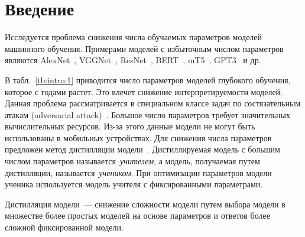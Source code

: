 \documentclass[12pt]{a&t}
\begin{document}
\section{Введение}
Исследуется проблема снижения числа обучаемых параметров моделей машинного обучения. Примерами моделей с избыточным числом параметров являются AlexNet~\cite{Krizhevsky2012}, VGGNet~\cite{Simonyan2014}, ResNet~\cite{Kaiming2015}, BERT~\cite{Devlin2018, Vaswani2017}, mT5~\cite{Linting2021}, GPT3~\cite{Brown2020} и др.
\begin{table}[h!]
\captionsetup{labelfont=bf}
\caption{{\bf Таблица 1.} Число параметров в моделях машинного обучения}
\label{tb:intro:1}
\begin{center}
\end{center}
\end{table}
В табл.~\ref{tb:intro:1} приводится число параметров моделей глубокого обучения,
которое с годами растет.
Это влечет снижение интерпретируемости моделей.
Данная проблема рассматривается в специальном классе задач по состязательным атакам (adversarial attack)~\cite{Zheng2020}.
Большое число параметров требует значительных вычислительных ресурсов.
Из-за этого данные модели не могут быть использованы в мобильных устройствах.
Для снижения числа параметров предложен метод дистилляции модели~\cite{Hinton2015, Vapnik2015, Lopez2016}.
Дистиллируемая модель с большим числом параметров называется~\textit{учителем}, а модель, получаемая путем дистилляции, называется~\textit{учеником}.
При оптимизации параметров модели ученика используется модель учителя с фиксированными параметрами.
\begin{definition}
Дистилляция модели~--- снижение сложности модели путем выбора модели в множестве более простых моделей на основе параметров и ответов более сложной фиксированной модели.
\end{definition}
\end{document}
